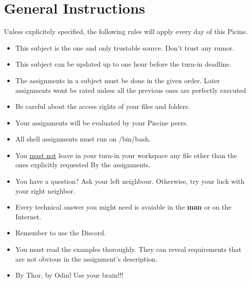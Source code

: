 \documentclass[12pt, a4paper]{report}
\begin{document}
\chapter{General Instructions}
Unless explicitely specified, the following rules will apply every day of this Picine.
	\begin{itemize}
		\item This subject is the one and only trustable source. Don't trust any rumor.
		\item This subject can be updated up to one hour before the turn-in deadline.
		\item The assignments in a subject must be done in the given order. Later assignments
				wont be rated unless all the previous ones are perfectly executed
		\item Be careful about the access rights of your files and folders.
		\item Your assignments will be evaluated by your Piscine peers.
		\item All shell assignments must run on /bin/bash.
		\item You \underline{must not} leave in your turn-in your workspace any file other than the ones
				explicitly requested By the assignments.
		\item You have a question? Ask your left neighbour. Otherwise, try your luck with your
				right neighbor.
		\item Every technical answer you might need is avaiable in the \textbf{man} or on the Internet.
		\item Remember to use the Discord.
		\item You must read the examples thoroughly. They can reveal requirements that are not obvious in
				the assignment's description.
		\item By Thor, by Odin! Use your brain!!!
		\end{itemize}
\end{document}
